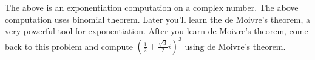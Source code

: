   The above is an exponentiation computation on
  a complex number.
  The above computation uses binomial theorem.
  Later you'll learn the 
  de Moivre's theorem, a very powerful tool for exponentiation.
  After you learn de Moivre's theorem, come back to this problem
  and compute
  $\left(\frac{1}{2} + \frac{\sqrt{3}}{2}i \right)^3$
  using de Moivre's theorem.
